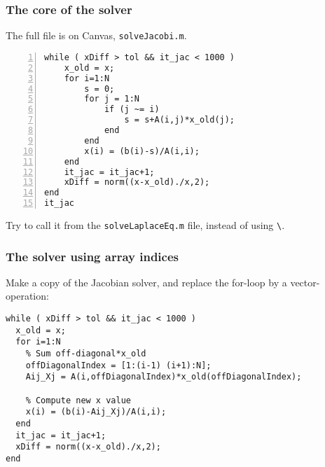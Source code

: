 \begin{frame}[fragile]
  \frametitle{The core of the solver}
  The full file is on Canvas, \lstinline$solveJacobi.m$.
  \begin{lstlisting}[numbers=left]
  while ( xDiff > tol && it_jac < 1000 )
    x_old = x;
    for i=1:N
        s = 0;
        for j = 1:N
            if (j ~= i)
                s = s+A(i,j)*x_old(j);
            end
        end
        x(i) = (b(i)-s)/A(i,i);
    end
    it_jac = it_jac+1;
    xDiff = norm((x-x_old)./x,2);
end
it_jac
  \end{lstlisting}
  \pause
  Try to call it from the \lstinline$solveLaplaceEq.m$ file, instead of using \lstinline$\$.
\end{frame}


\begin{frame}[fragile]
  \frametitle{The solver using array indices}
  Make a copy of the Jacobian solver, and replace the for-loop by a vector-operation:
  \begin{lstlisting}[basicstyle=\scriptsize\ttfamily]
% While not converged or max_it not reached
while ( xDiff > tol && it_jac < 1000 )
  x_old = x;
  for i=1:N
    % Sum off-diagonal*x_old
    offDiagonalIndex = [1:(i-1) (i+1):N];
    Aij_Xj = A(i,offDiagonalIndex)*x_old(offDiagonalIndex);

    % Compute new x value
    x(i) = (b(i)-Aij_Xj)/A(i,i);
  end
  it_jac = it_jac+1;
  xDiff = norm((x-x_old)./x,2);
end
\end{lstlisting}
\end{frame}


